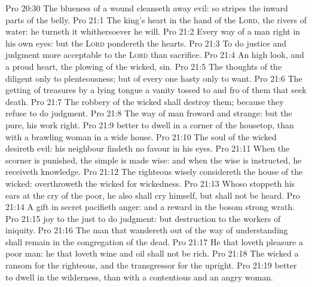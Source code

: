 \vs Pro 20:30 The blueness of a wound cleanseth away evil: so  stripes the inward parts of the belly.
\vs Pro 21:1 The king's heart  in the hand of the \textsc{Lord},  the rivers of water: he turneth it whithersoever he will.
\vs Pro 21:2 Every way of a man  right in his own eyes: but the \textsc{Lord} pondereth the hearts.
\vs Pro 21:3 To do justice and judgment  more acceptable to the \textsc{Lord} than sacrifice.
\vs Pro 21:4 An high look, and a proud heart,  the plowing of the wicked,  sin.
\vs Pro 21:5 The thoughts of the diligent  only to plenteousness; but of every one  hasty only to want.
\vs Pro 21:6 The getting of treasures by a lying tongue  a vanity tossed to and fro of them that seek death.
\vs Pro 21:7 The robbery of the wicked shall destroy them; because they refuse to do judgment.
\vs Pro 21:8 The way of man  froward and strange: but  the pure, his work  right.
\vs Pro 21:9  better to dwell in a corner of the housetop, than with a brawling woman in a wide house.
\vs Pro 21:10 The soul of the wicked desireth evil: his neighbour findeth no favour in his eyes.
\vs Pro 21:11 When the scorner is punished, the simple is made wise: and when the wise is instructed, he receiveth knowledge.
\vs Pro 21:12 The righteous  wisely considereth the house of the wicked:  overthroweth the wicked for  wickedness.
\vs Pro 21:13 Whoso stoppeth his ears at the cry of the poor, he also shall cry himself, but shall not be heard.
\vs Pro 21:14 A gift in secret pacifieth anger: and a reward in the bosom strong wrath.
\vs Pro 21:15  joy to the just to do judgment: but destruction  to the workers of iniquity.
\vs Pro 21:16 The man that wandereth out of the way of understanding shall remain in the congregation of the dead.
\vs Pro 21:17 He that loveth pleasure  a poor man: he that loveth wine and oil shall not be rich.
\vs Pro 21:18 The wicked  a ransom for the righteous, and the transgressor for the upright.
\vs Pro 21:19  better to dwell in the wilderness, than with a contentious and an angry woman.
